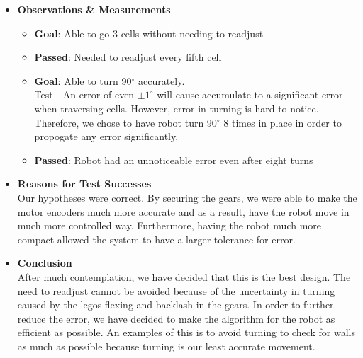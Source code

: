 \documentclass[11pt]{article}
\begin{document}
\begin{itemize}
\item \textbf{Observations \& Measurements}
	\begin{itemize}
	\item \textbf{Goal}: Able to go 3 cells without needing to readjust
 	\item \textbf{Passed}: Needed to readjust every fifth cell
 	\item \textbf{Goal}: Able to turn 90$^{\circ}$ accurately.\\
	Test - An error of even $ \pm 1^{\circ}$ will cause accumulate to a significant error when traversing cells. However, error in turning is hard to notice. Therefore, we chose to have robot turn 90$^{\circ}$ 8 times in place in order to propogate any error significantly. 
	\item \textbf{Passed}: Robot had an unnoticeable error even after eight turns
	\end{itemize}
\item \textbf{Reasons for Test Successes}\\
Our hypotheses were correct. By securing the gears, we were able to make the motor encoders much more accurate and as a result, have the robot move in much more controlled way. Furthermore, having the robot much more compact allowed the system to have a larger tolerance for error.
\item \textbf{Conclusion}\\
After much contemplation, we have decided that this is the best design. The need to readjust cannot be avoided because of the uncertainty in turning caused by the legos flexing and backlash in the gears. In order to further reduce the error, we have decided to make the algorithm for the robot as efficient as possible. An examples of this is to avoid turning to check for walls as much as possible because turning is our least accurate movement.
\end{itemize}
\newpage

\end{document}
